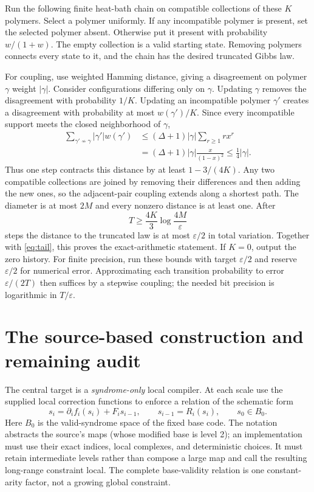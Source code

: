 \documentclass[11pt,a4paper]{article}
\begin{document}
Run the following finite heat-bath chain on compatible collections of these $K$ polymers. Select a polymer uniformly. If any incompatible polymer is present, set the selected polymer absent. Otherwise put it present with probability $w/(1+w)$. The empty collection is a valid starting state. Removing polymers connects every state to it, and the chain has the desired truncated Gibbs law.

For coupling, use weighted Hamming distance, giving a disagreement on polymer $\gamma$ weight $|\gamma|$. Consider configurations differing only on $\gamma$. Updating $\gamma$ removes the disagreement with probability $1/K$. Updating an incompatible polymer $\gamma'$ creates a disagreement with probability at most $w(\gamma')/K$. Since every incompatible support meets the closed neighborhood of $\gamma$,
\begin{align}
 \sum_{\gamma'\not\sim\gamma}|\gamma'|w(\gamma')
 &\leq (\Delta+1)|\gamma|\sum_{r\geq1}r x^r\\
 &= (\Delta+1)|\gamma|\frac{x}{(1-x)^2}
 \leq\frac14|\gamma|.
\end{align}
Thus one step contracts this distance by at least $1-3/(4K)$. Any two compatible collections are joined by removing their differences and then adding the new ones, so the adjacent-pair coupling extends along a shortest path. The diameter is at most $2M$ and every nonzero distance is at least one. After
\begin{equation}\label{eq:mix}
 T\geq\frac{4K}{3}\log\frac{4M}{\varepsilon}
\end{equation}
steps the distance to the truncated law is at most $\varepsilon/2$ in total variation. Together with \eqref{eq:tail}, this proves the exact-arithmetic statement. If $K=0$, output the zero history. For finite precision, run these bounds with target $\varepsilon/2$ and reserve $\varepsilon/2$ for numerical error. Approximating each transition probability to error $\varepsilon/(2T)$ then suffices by a stepwise coupling; the needed bit precision is logarithmic in $T/\varepsilon$.

\section{The source-based construction and remaining audit}

The central target is a \emph{syndrome-only} local compiler. At each scale use the supplied local correction functions to enforce a relation of the schematic form
\begin{equation}\label{eq:residual}
 s_i=\partial_i f_i(s_i)+F_i s_{i-1},\qquad s_{i-1}=R_i(s_i),\qquad s_0\in B_0.
\end{equation}
Here $B_0$ is the valid-syndrome space of the fixed base code. The notation abstracts the source's maps (whose modified base is level 2); an implementation must use their exact indices, local complexes, and deterministic choices. It must retain intermediate levels rather than compose a large map and call the resulting long-range constraint local. The complete base-validity relation is one constant-arity factor, not a growing global constraint.
\end{document}

